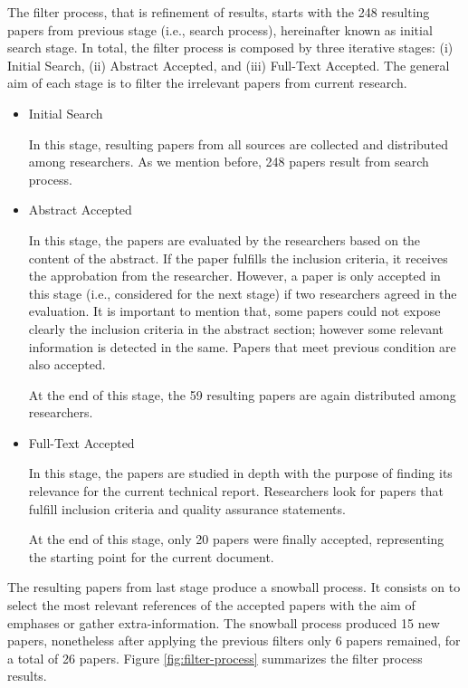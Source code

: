 The filter process, that is refinement of results, starts with the 248 resulting papers from previous stage (i.e., search process), hereinafter known as initial search stage. In total, the filter process is composed by three iterative stages: (i) Initial Search, (ii) Abstract Accepted, and (iii) Full-Text Accepted. The general aim of each stage is to filter the irrelevant papers from current research. 

\begin{itemize}
	\item Initial Search
	
	In this stage, resulting papers from all sources are collected and distributed among researchers. As we mention before, 248 papers result from search process.
	
	\item Abstract Accepted
	
	In this stage, the papers are evaluated by the researchers based on the content of the abstract. If the paper fulfills the inclusion criteria, it receives the approbation from the researcher. However, a paper is only accepted in this stage (i.e., considered for the next stage) if two researchers agreed in the evaluation. It is important to mention that, some papers could not expose clearly the inclusion criteria in the abstract section; however some relevant information is detected in the same. Papers that meet previous condition are also accepted. 
	
	At the end of this stage, the 59 resulting papers are again distributed among researchers.
	
	\item Full-Text Accepted 
	
	In this stage, the papers are studied in depth with the purpose of finding its relevance for the current technical report. Researchers look for papers that fulfill inclusion criteria and quality assurance statements.
	
	At the end of this stage, only 20 papers were finally accepted, representing the starting point for the current document.
	
\end{itemize}

The resulting papers from last stage produce a snowball process. It consists on to select the most relevant references of the accepted papers with the aim of emphases or gather extra-information. The snowball process produced 15 new papers, nonetheless after applying the previous filters only 6 papers remained, for a total of 26 papers. Figure \ref{fig:filter-process} summarizes the filter process results.

